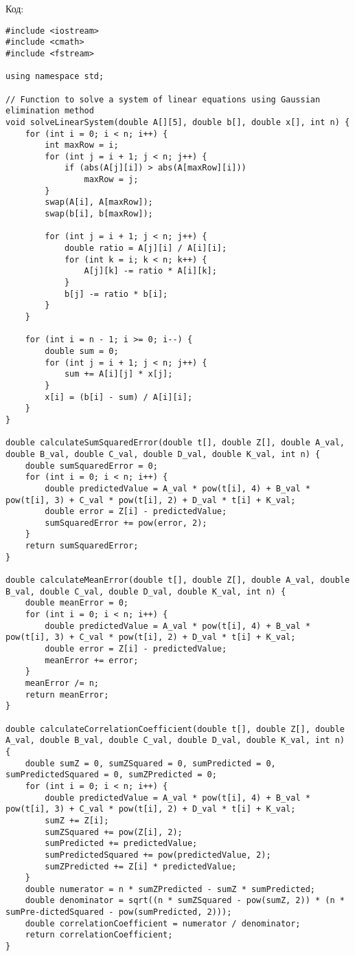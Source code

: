 \documentclass[0.1pt, cmcyralt]{article}
\begin{document}
Код:
\begin{lstlisting}
#include <iostream>
#include <cmath>
#include <fstream>

using namespace std;

// Function to solve a system of linear equations using Gaussian elimination method
void solveLinearSystem(double A[][5], double b[], double x[], int n) {
    for (int i = 0; i < n; i++) {
        int maxRow = i;
        for (int j = i + 1; j < n; j++) {
            if (abs(A[j][i]) > abs(A[maxRow][i]))
                maxRow = j;
        }
        swap(A[i], A[maxRow]);
        swap(b[i], b[maxRow]);

        for (int j = i + 1; j < n; j++) {
            double ratio = A[j][i] / A[i][i];
            for (int k = i; k < n; k++) {
                A[j][k] -= ratio * A[i][k];
            }
            b[j] -= ratio * b[i];
        }
    }

    for (int i = n - 1; i >= 0; i--) {
        double sum = 0;
        for (int j = i + 1; j < n; j++) {
            sum += A[i][j] * x[j];
        }
        x[i] = (b[i] - sum) / A[i][i];
    }
}

double calculateSumSquaredError(double t[], double Z[], double A_val, double B_val, double C_val, double D_val, double K_val, int n) {
    double sumSquaredError = 0;
    for (int i = 0; i < n; i++) {
        double predictedValue = A_val * pow(t[i], 4) + B_val * pow(t[i], 3) + C_val * pow(t[i], 2) + D_val * t[i] + K_val;
        double error = Z[i] - predictedValue;
        sumSquaredError += pow(error, 2);
    }
    return sumSquaredError;
}

double calculateMeanError(double t[], double Z[], double A_val, double B_val, double C_val, double D_val, double K_val, int n) {
    double meanError = 0;
    for (int i = 0; i < n; i++) {
        double predictedValue = A_val * pow(t[i], 4) + B_val * pow(t[i], 3) + C_val * pow(t[i], 2) + D_val * t[i] + K_val;
        double error = Z[i] - predictedValue;
        meanError += error;
    }
    meanError /= n;
    return meanError;
}

double calculateCorrelationCoefficient(double t[], double Z[], double A_val, double B_val, double C_val, double D_val, double K_val, int n) {
    double sumZ = 0, sumZSquared = 0, sumPredicted = 0, sumPredictedSquared = 0, sumZPredicted = 0;
    for (int i = 0; i < n; i++) {
        double predictedValue = A_val * pow(t[i], 4) + B_val * pow(t[i], 3) + C_val * pow(t[i], 2) + D_val * t[i] + K_val;
        sumZ += Z[i];
        sumZSquared += pow(Z[i], 2);
        sumPredicted += predictedValue;
        sumPredictedSquared += pow(predictedValue, 2);
        sumZPredicted += Z[i] * predictedValue;
    }
    double numerator = n * sumZPredicted - sumZ * sumPredicted;
    double denominator = sqrt((n * sumZSquared - pow(sumZ, 2)) * (n * sumPre-dictedSquared - pow(sumPredicted, 2)));
    double correlationCoefficient = numerator / denominator;
    return correlationCoefficient;
}


\end{lstlisting}
\end{document}
